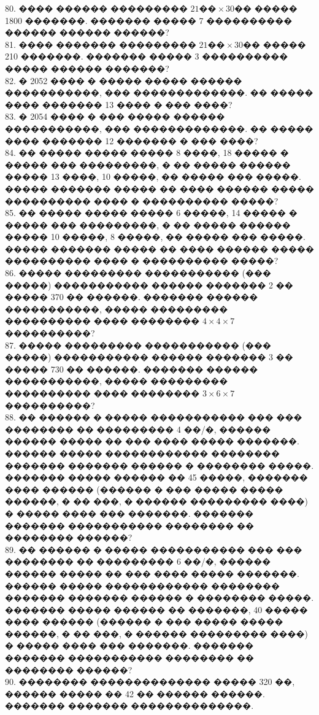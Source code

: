\documentclass[12pt]{article}
\begin{document}
80. ���� ������ ��������� $21\text{��}\times30\text{��}$ ����� 1800 �������. ������� ����� 7 ���������� ������ ������ ������?\\
81. ���� ������� ��������� $21\text{��}\times30\text{��}$ ����� 210 �������. ������� ����� 3 ���������� ����� ������ �������?\\
82. � 2052 ���� � ����� ����� ������ �����������, ��� �������������. �� ����� ���� ������� 13 ���� � ��� ����?\\
83. � 2054 ���� � ��� ����� ������ �����������, ��� �������������. �� ����� ���� ������� 12 ������� � ��� ����?\\
84. �� ����� ����� ����� 8 ����, 18 ����� � ����� ��� ���������, � �� ����� ������ ����� 13 ����, 10 �����, �� ����� ��� �����. ����� ������� ����� �� ���� ������ ����� ���������� ���� � ���������� �����?\\
85. �� ����� ����� ����� 6 �����, 14 ����� � ����� ��� ���������, � �� ����� ������ ����� 10 �����, 8 �����, �� ����� ��� �����. ����� ������� ����� �� ���� ������ ����� ���������� ���� � ���������� �����?\\
86. ����� ��������� ����������� (��� �����) ����������� ������ ������� 2 �� ����� 370 �� ������. ������� ������ �����������, ����� ��������� ���������� ���� �������� $4\times4\times7$ ����������?\\
87. ����� ��������� ����������� (��� �����) ����������� ������ ������� 3 �� ����� 730 �� ������. ������� ������ �����������, ����� ��������� ���������� ���� �������� $3\times6\times7$ ����������?\\
88. �� ������ � ����� ����������� ��� ��� �������� �� ��������� 4 ��/�, ������ ������ ����� �� ��� ���� ����� �������. ������ ����� ������������ �������� ������� ������� ������ � �������� �����. ������� ����� ������ �� 45 �����, ������� ���� ������ (������ � ��� ����� ����� ������, � �� ���, � ������ ��������� ����) � ����� ���� ��� �������. ������� ������� ����������� �������� �� �������� ������?\\
89. �� ������ � ����� ����������� ��� ��� �������� �� ��������� 6 ��/�, ������ ������ ����� �� ��� ���� ����� �������. ������ ����� ������������ �������� ������� ������� ������ � �������� �����. ������� ����� ������ �� �������, 40 ����� ���� ������ (������ � ��� ����� ����� ������, � �� ���, � ������ ��������� ����) � ����� ���� ��� �������. ������� ������� ����������� �������� �� �������� ������?\\
90. �������� �������������� ����� 320 ��, ������ ����� �� 42 �� ������ ������. ������� ������� ��������������.\\
\end{document}
